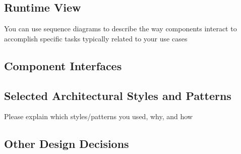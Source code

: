 \subsection{Runtime View}
You can use sequence diagrams to describe the way components interact
to accomplish specific tasks typically related to your use cases
\subsection{Component Interfaces}
\subsection{Selected Architectural Styles and Patterns}
Please explain which styles/patterns you used, why, and how
\subsection{Other Design Decisions}